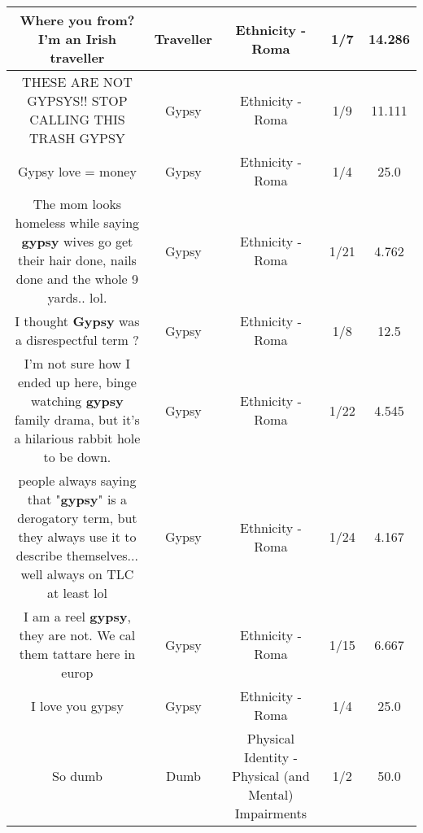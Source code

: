 \documentclass[11pt]{article}
\newlength\mylength
\begin{document}
\begin{center}
\begin{longtable}{|C{.65\mylength}|C{.30\mylength}|C{.12\mylength}|C{.12\mylength}|C{.12\mylength}|}
  \small Where you from? I'm an Irish traveller\normalsize   & Traveller & Ethnicity - Roma & 1/7 & 14.286 \\  \hline
  \small THESE ARE NOT GYPSYS!! STOP CALLING THIS TRASH GYPSY\normalsize   & Gypsy & Ethnicity - Roma & 1/9 & 11.111 \\  \hline
  \small Gypsy love = money\normalsize   & Gypsy & Ethnicity - Roma & 1/4 & 25.0 \\  \hline
  \small The mom looks homeless while saying \textbf{gypsy} wives go get their hair done, nails done and the whole 9 yards.. lol.\normalsize   & Gypsy & Ethnicity - Roma & 1/21 & 4.762 \\  \hline
  \small I thought \textbf{Gypsy} was a disrespectful term ?\normalsize   & Gypsy & Ethnicity - Roma & 1/8 & 12.5 \\  \hline
  \small I'm not sure how I ended up here, binge watching \textbf{gypsy} family drama, but it's a hilarious rabbit hole to be down.\normalsize   & Gypsy & Ethnicity - Roma & 1/22 & 4.545 \\  \hline
  \small people always saying that "\textbf{gypsy}" is a derogatory term, but they always use it to describe themselves... well always on TLC at least lol\normalsize   & Gypsy & Ethnicity - Roma & 1/24 & 4.167 \\  \hline
  \small I am a reel \textbf{gypsy}, they are not. We cal them tattare here in europ\normalsize   & Gypsy & Ethnicity - Roma & 1/15 & 6.667 \\  \hline
  \small I love you gypsy\normalsize   & Gypsy & Ethnicity - Roma & 1/4 & 25.0 \\  \hline
  \small So dumb\normalsize   & Dumb & Physical Identity - Physical (and Mental) Impairments & 1/2 & 50.0 \\  \hline

\end{longtable}
\end{center}
\end{document}
